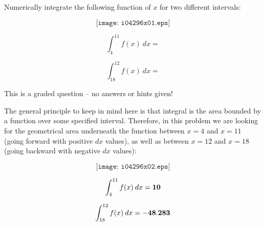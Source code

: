 

Numerically integrate the following function of $x$ for two different intervals:

$$\texttt{[image: i04296x01.eps]}$$

\vskip 50pt

$$\int_{4}^{11} f(x) \> dx = $$

\vskip 50pt

$$\int_{18}^{12} f(x) \> dx = $$

\vfil 

\eject






This is a graded question -- no answers or hints given!







The general principle to keep in mind here is that integral is the area bounded by a function over some specified interval.  Therefore, in this problem we are looking for the geometrical area underneath the function between $x=4$ and $x=11$ (going forward with positive $dx$ values), as well as between $x=12$ and $x=18$ (going backward with negative $dx$ values):

$$\texttt{[image: i04296x02.eps]}$$

$$\int_{4}^{11} f(x) \> dx = {\bf 10}$$

\vskip 50pt

$$\int_{18}^{12} f(x) \> dx = {\bf -48.283}$$




